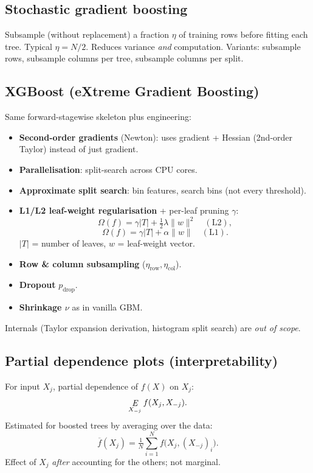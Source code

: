 \subsection{Stochastic gradient boosting}
Subsample (without replacement) a fraction $\eta$ of training rows before fitting each tree. Typical $\eta=N/2$. Reduces variance \emph{and} computation. Variants: subsample rows, subsample columns per tree, subsample columns per split.

\subsection{XGBoost (eXtreme Gradient Boosting)}
Same forward-stagewise skeleton plus engineering:
\begin{itemize}
\item \textbf{Second-order gradients} (Newton): uses gradient + Hessian (2nd-order Taylor) instead of just gradient.
\item \textbf{Parallelisation}: split-search across CPU cores.
\item \textbf{Approximate split search}: bin features, search bins (not every threshold).
\item \textbf{L1/L2 leaf-weight regularisation} + per-leaf pruning $\gamma$:
\[ \Omega(f) = \gamma |T| + \tfrac12 \lambda \|w\|^2 \quad (\text{L2}), \]
\[ \Omega(f) = \gamma |T| + \alpha \|w\| \quad (\text{L1}). \]
$|T|$ = number of leaves, $w$ = leaf-weight vector.
\item \textbf{Row \& column subsampling} ($\eta_{\text{row}}, \eta_{\text{col}}$).
\item \textbf{Dropout} $p_{\text{drop}}$.
\item \textbf{Shrinkage $\nu$} as in vanilla GBM.
\end{itemize}
Internals (Taylor expansion derivation, histogram split search) are \emph{out of scope}.

\subsection{Partial dependence plots (interpretability)}
For input $X_j$, partial dependence of $f(X)$ on $X_j$:
\[ \mathop{\mathit{E}}_{X_{-j}} f(X_j, X_{-j}). \]
Estimated for boosted trees by averaging over the data:
\[ \overline{f}(X_j) = \tfrac{1}{N} \sum_{i=1}^N f\!\big(X_j, (X_{-j})_i\big). \]
Effect of $X_j$ \emph{after} accounting for the others; not marginal.

